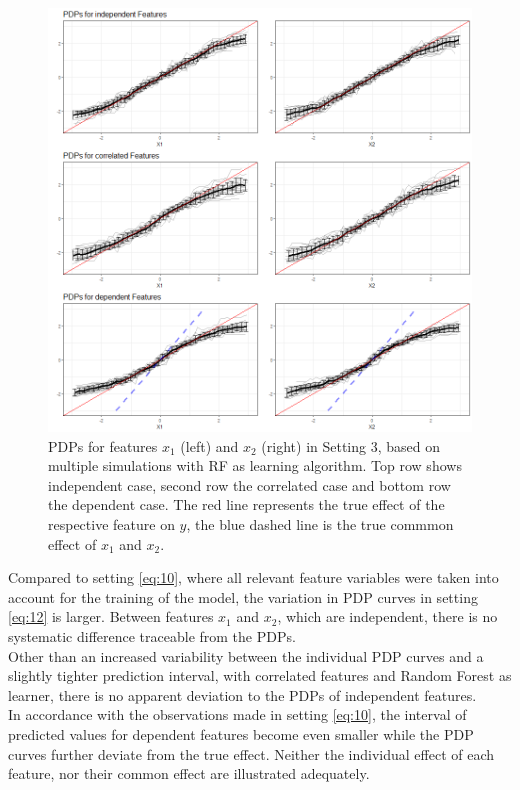 \documentclass[
]{krantz}
\begin{document}
\begin{figure}

\includegraphics[width=1\linewidth]{images/VK_PDP_20_Set3_RF} \hfill{}

\caption{PDPs for features $x_1$ (left) and $x_2$  (right) in Setting 3, based on multiple simulations with RF as learning algorithm. Top row shows independent case, second row the correlated case and bottom row the dependent case. The red line represents the true effect of the respective feature on $y$, the blue dashed line is the true commmon effect of $x_1$ and $x_2$.}\label{fig:Figure20}
\end{figure}

Compared to setting \eqref{eq:10}, where all relevant feature variables were taken into account for the training of the model, the variation in PDP curves in setting \eqref{eq:12} is larger. Between features \(x_1\) and \(x_2\), which are independent, there is no systematic difference traceable from the PDPs.\\
Other than an increased variability between the individual PDP curves and a slightly tighter prediction interval, with correlated features and Random Forest as learner, there is no apparent deviation to the PDPs of independent features.\\
In accordance with the observations made in setting \eqref{eq:10}, the interval of predicted values for dependent features become even smaller while the PDP curves further deviate from the true effect. Neither the individual effect of each feature, nor their common effect are illustrated adequately.
\end{document}
